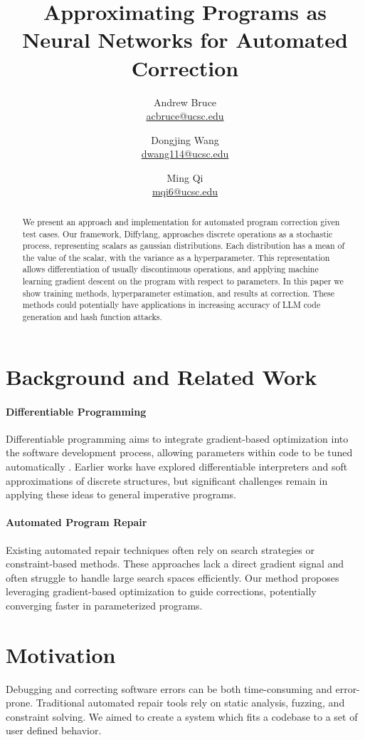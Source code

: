 \documentclass{article}
\title{Approximating Programs as Neural Networks for Automated Correction}
\author{
  Andrew Bruce \\ \href{mailto:acbruce@ucsc.edu}{acbruce@ucsc.edu}
  \and
  Dongjing Wang \\ \href{mailto:dwang114@ucsc.edu}{dwang114@ucsc.edu}
  \and
  Ming Qi \\ \href{mailto:mqi6@ucsc.edu}{mqi6@ucsc.edu}
}
\begin{document}
\maketitle

\begin{abstract}
  We present an approach and implementation for automated program correction given test cases. Our framework, Diffylang, approaches discrete operations as a stochastic process, representing scalars as gaussian distributions. Each distribution has a mean of the value of the scalar, with the variance as a hyperparameter. This representation allows differentiation of usually discontinuous operations, and applying machine learning gradient descent on the program with respect to parameters. In this paper we show training methods, hyperparameter estimation, and results at correction. These methods could potentially have applications in increasing accuracy of LLM code generation and hash function attacks.
\end{abstract}

\section{Background and Related Work}
\paragraph{Differentiable Programming} Differentiable programming aims to integrate gradient-based optimization into the software development process, allowing parameters within code to be tuned automatically \cite{blondel2024elementsdifferentiableprogramming,DBLP:journals/corr/abs-1907-07587,vandemeulebroucke2018myia}. Earlier works have explored differentiable interpreters and soft approximations of discrete structures, but significant challenges remain in applying these ideas to general imperative programs.

\paragraph{Automated Program Repair} Existing automated repair techniques often rely on search strategies or constraint-based methods. These approaches lack a direct gradient signal and often struggle to handle large search spaces efficiently. Our method proposes leveraging gradient-based optimization to guide corrections, potentially converging faster in parameterized programs.

\section*{Motivation}
Debugging and correcting software errors can be both time-consuming and error-prone. Traditional automated repair tools rely on static analysis, fuzzing, and constraint solving. We aimed to create a system which fits a codebase to a set of user defined behavior.
\end{document}

